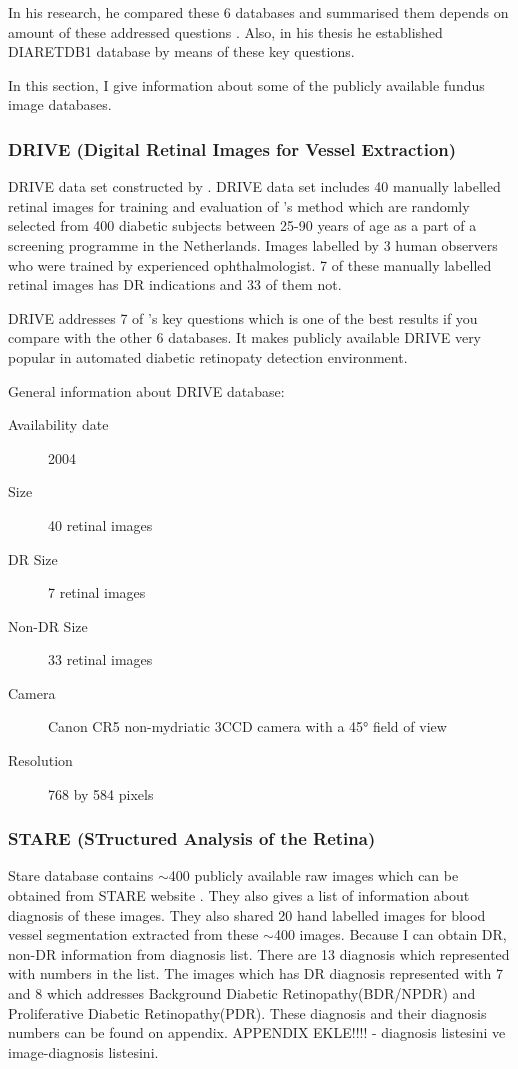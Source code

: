 In his research, he compared these 6 databases and summarised them depends on amount of these addressed questions \citep{kauppi2013constructing}. Also, in his thesis he established DIARETDB1 database by means of these key questions.

In this section, I give information about some of the publicly available fundus image databases.

\subsubsection{DRIVE (Digital Retinal Images for Vessel Extraction)}
DRIVE data set constructed by \citet{staal2004ridge}.
DRIVE data set includes 40 manually labelled retinal images for training and evaluation of \citet{staal2004ridge}'s method which are randomly selected from 400 diabetic subjects between 25-90 years of age as a part of a screening programme in the Netherlands. Images labelled by 3 human observers who were trained by experienced ophthalmologist. 7 of these manually labelled retinal images has DR indications and 33 of them not. 

DRIVE addresses 7 of \citet{kauppi2013constructing}'s key questions which is one of the best results if you compare with the other 6 databases. It makes publicly available DRIVE very popular in automated diabetic retinopaty detection environment.

General information about DRIVE database:
\begin{description}
    \item[Availability date] 2004
    \item[Size] 40 retinal images
    \item[DR Size] 7 retinal images
    \item[Non-DR Size] 33 retinal images
    \item[Camera] Canon CR5 non-mydriatic 3CCD camera with a 45° field of view
    \item[Resolution] 768 by 584 pixels
\end{description}

\subsubsection{STARE (STructured Analysis of the Retina)}
Stare database contains $\sim$400 publicly available raw images which can be obtained from STARE website \citep{STARE}. They also gives a list of information about diagnosis of these images. They also shared 20 hand labelled images for blood vessel segmentation \citep{hoover2000locating} extracted from these $\sim$400 images. Because I can obtain DR, non-DR information from diagnosis list. There are 13 diagnosis which represented with numbers in the list. The images which has DR diagnosis represented with 7 and 8 which addresses Background Diabetic Retinopathy(BDR/NPDR) and Proliferative Diabetic Retinopathy(PDR). These diagnosis and their diagnosis numbers can be found on appendix. {APPENDIX EKLE!!!!} - diagnosis listesini ve image-diagnosis listesini.

